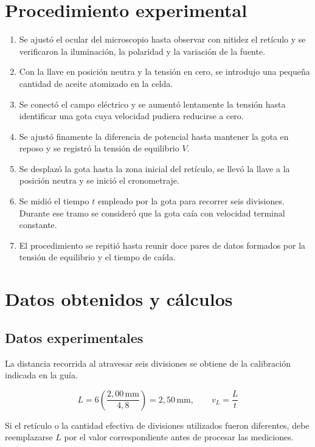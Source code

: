 \documentclass{article}
\begin{document}
\section{Procedimiento experimental}

\begin{enumerate}
    \item Se ajustó el ocular del microscopio hasta observar con nitidez el retículo y se verificaron la iluminación, la polaridad y la variación de la fuente.
    \item Con la llave en posición neutra y la tensión en cero, se introdujo una pequeña cantidad de aceite atomizado en la celda.
    \item Se conectó el campo eléctrico y se aumentó lentamente la tensión hasta identificar una gota cuya velocidad pudiera reducirse a cero.
    \item Se ajustó finamente la diferencia de potencial hasta mantener la gota en reposo y se registró la tensión de equilibrio $V$.
    \item Se desplazó la gota hasta la zona inicial del retículo, se llevó la llave a la posición neutra y se inició el cronometraje.
    \item Se midió el tiempo $t$ empleado por la gota para recorrer seis divisiones. Durante ese tramo se consideró que la gota caía con velocidad terminal constante.
    \item El procedimiento se repitió hasta reunir doce pares de datos formados por la tensión de equilibrio y el tiempo de caída.
\end{enumerate}

\section{Datos obtenidos y cálculos}

\subsection{Datos experimentales}

La distancia recorrida al atravesar seis divisiones se obtiene de la calibración indicada en la guía.

\begin{equation}
L=6\left(\frac{2,00\,\mathrm{mm}}{4,8}\right)=2,50\,\mathrm{mm},\qquad v_L=\frac{L}{t}
\end{equation}

Si el retículo o la cantidad efectiva de divisiones utilizados fueron diferentes, debe reemplazarse $L$ por el valor correspondiente antes de procesar las mediciones.
\end{document}

